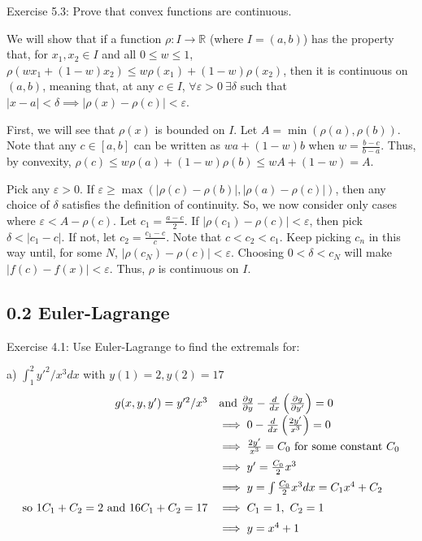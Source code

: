 \documentclass[11pt]{article}
\newcommand{\R}{\mathbb{R}}
\begin{document}
Exercise 5.3: Prove that convex functions are continuous.

We will show that if a function $\rho:I\to\R$ (where $I=(a,b)$) has the property that, for
$x_1,x_2\in I$ and all $0\leq w\leq1$,
$\rho(wx_1+(1-w)x_2)\leq w\rho(x_1)+(1-w)\rho(x_2)$,
then it is continuous on $(a,b)$, meaning that, at any $c\in I$,
$\forall \varepsilon>0\ \exists\delta$ such that
$|x-a|<\delta\implies|\rho(x)-\rho(c)|<\varepsilon$.

First, we will see that $\rho(x)$ is bounded on $I$.
Let $A=\min(\rho(a),\rho(b))$.
Note that any $c\in[a,b]$ can be written as
$wa+(1-w)b$ when $w=\frac{b-c}{b-a}$. Thus, by convexity,
$\rho(c)\leq w\rho(a)+(1-w)\rho(b)\leq wA+(1-w)=A$.

Pick any $\varepsilon>0$. If
$\varepsilon\geq\max(|\rho(c)-\rho(b)|,|\rho(a)-\rho(c)|)$, then any
choice of $\delta$ satisfies the definition of continuity. So, we now
consider only cases where
$\varepsilon<A-\rho(c)$. Let $c_1=\frac{a-c}{2}$.
If $|\rho(c_1)-\rho(c)|<\varepsilon$, then pick $\delta<|c_1-c|$. If not,
let $c_2=\frac{c_1-c}{c}$. Note that $c<c_2<c_1$.
Keep picking $c_n$ in this way until, for some $N$,
$|\rho(c_N)-\rho(c)|<\varepsilon$. Choosing $0<\delta<c_N$ will make
$|f(c)-f(x)|<\varepsilon$. Thus, $\rho$ is continuous on $I$.

\subsection*{0.2 Euler-Lagrange}

Exercise 4.1: Use Euler-Lagrange to find the extremals for:

a) $\int_1^2y'^2/x^3dx$ with $y(1)=2,y(2)=17$
\[
\def\arraystretch{1.5}
\begin{array}{rl}
    g(x,y,y')=y'^2/x^3 &\textrm{and}\ 
    \frac{\partial g}{\partial y}-\frac{d}{dx}\left(\frac{\partial g}{\partial y'}\right)=0 \\
    &\implies 0-\frac{d}{dx}\left(\frac{2y'}{x^3}\right)=0 \\
    &\implies \frac{2y'}{x^3}=C_0\textrm{ for some constant $C_0$} \\
    &\implies y'=\frac{C_0}{2}x^3 \\
    &\implies y=\int\frac{C_0}{2}x^3dx=C_1x^4+C_2 \\
    \textrm{so }1C_1+C_2=2\textrm{ and }16C_1+C_2=17 &\implies
    C_1=1,\ C_2=1 \\
    &\implies y=x^4+1
\end{array}
\]
\end{document}
